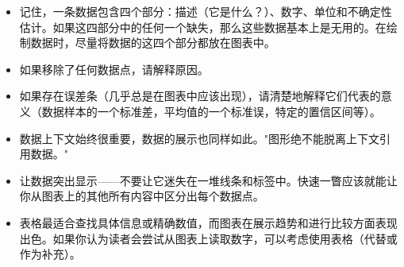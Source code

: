 \begin{itemize}
\item 记住，一条数据包含四个部分：描述（它是什么？）、数字、单位和不确定性估计。如果这四部分中的任何一个缺失，那么这些数据基本上是无用的。在绘制数据时，尽量将数据的这四个部分都放在图表中。
\item 如果移除了任何数据点，请解释原因。
\item 如果存在误差条（几乎总是在图表中应该出现），请清楚地解释它们代表的意义（数据样本的一个标准差，平均值的一个标准误，特定的置信区间等）。
\item 数据上下文始终很重要，数据的展示也同样如此。"图形绝不能脱离上下文引用数据。"
\item 让数据突出显示——不要让它迷失在一堆线条和标签中。快速一瞥应该就能让你从图表上的其他所有内容中区分出每个数据点。
\item 表格最适合查找具体信息或精确数值，而图表在展示趋势和进行比较方面表现出色。如果你认为读者会尝试从图表上读取数字，可以考虑使用表格（代替或作为补充）。

\end{itemize}
